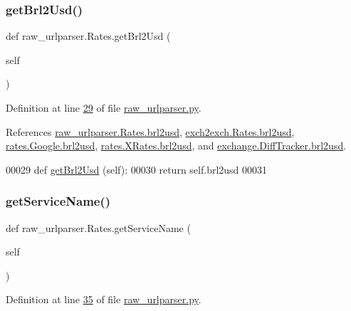 \subsubsection{\texorpdfstring{get\+Brl2\+Usd()}{getBrl2Usd()}}
{\footnotesize\ttfamily def raw\+\_\+urlparser.\+Rates.\+get\+Brl2\+Usd (\begin{DoxyParamCaption}\item[{}]{self }\end{DoxyParamCaption})}



Definition at line \hyperlink{raw__urlparser_8py_source_l00029}{29} of file \hyperlink{raw__urlparser_8py_source}{raw\+\_\+urlparser.\+py}.



References \hyperlink{raw__urlparser_8py_source_l00026}{raw\+\_\+urlparser.\+Rates.\+brl2usd}, \hyperlink{exch2exch_8py_source_l00030}{exch2exch.\+Rates.\+brl2usd}, \hyperlink{rates_8py_source_l00092}{rates.\+Google.\+brl2usd}, \hyperlink{rates_8py_source_l00147}{rates.\+X\+Rates.\+brl2usd}, and \hyperlink{exchange_8py_source_l00292}{exchange.\+Diff\+Tracker.\+brl2usd}.


\begin{DoxyCode}
00029     \textcolor{keyword}{def }\hyperlink{namespacerates_a083f2cdcd71554d301bcbfb0779ffa49}{getBrl2Usd} (self):
00030         \textcolor{keywordflow}{return} self.brl2usd
00031     
\end{DoxyCode}
\mbox{\label{classraw__urlparser_1_1_rates_ab4bd310d43849fed2df00b15b387254e}} 
\subsubsection{\texorpdfstring{get\+Service\+Name()}{getServiceName()}}
{\footnotesize\ttfamily def raw\+\_\+urlparser.\+Rates.\+get\+Service\+Name (\begin{DoxyParamCaption}\item[{}]{self }\end{DoxyParamCaption})}



Definition at line \hyperlink{raw__urlparser_8py_source_l00035}{35} of file \hyperlink{raw__urlparser_8py_source}{raw\+\_\+urlparser.\+py}.



